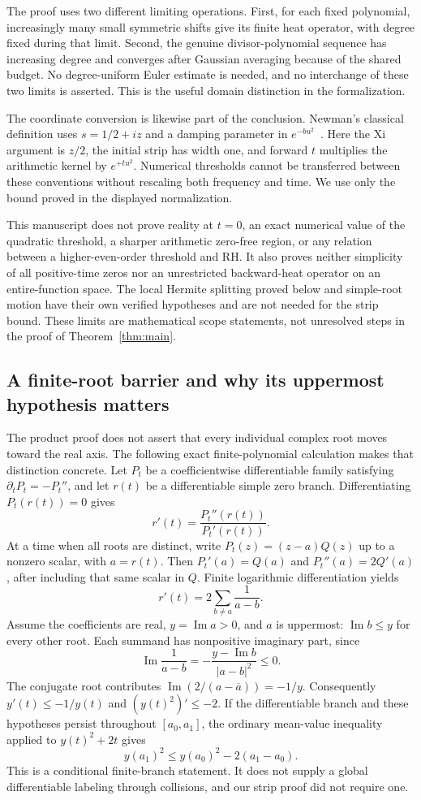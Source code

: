 \documentclass[11pt]{article}
\begin{document}
The proof uses two different limiting operations. First, for each fixed
polynomial, increasingly many small symmetric shifts give its finite
heat operator, with degree fixed during that limit. Second, the genuine
divisor-polynomial sequence has increasing degree and converges after
Gaussian averaging because of the shared budget. No degree-uniform
Euler estimate is needed, and no interchange of these two limits is
asserted. This is the useful domain distinction in the formalization.

The coordinate conversion is likewise part of the conclusion. Newman's
classical definition uses $s=1/2+iz$ and a damping parameter in
$e^{-bu^2}$~\cite{Newman}. Here the Xi argument is $z/2$, the initial
strip has width one, and forward $t$ multiplies the arithmetic kernel
by $e^{+tu^2}$. Numerical thresholds cannot be transferred between these
conventions without rescaling both frequency and time. We use only the
bound proved in the displayed normalization.

This manuscript does not prove reality at $t=0$, an exact numerical value of the quadratic
threshold, a sharper arithmetic zero-free region, or any relation between
a higher-even-order threshold and RH. It also proves neither simplicity
of all positive-time zeros nor an unrestricted backward-heat operator on
an entire-function space. The local Hermite splitting proved below and simple-root motion
have their own verified hypotheses and are not needed for the strip bound. These limits
are mathematical scope statements, not unresolved steps in the proof of
Theorem~\ref{thm:main}.



\subsection*{A finite-root barrier and why its uppermost hypothesis matters}
The product proof does not assert that every individual complex root
moves toward the real axis. The following exact finite-polynomial
calculation makes that distinction concrete.
Let $P_t$ be a coefficientwise differentiable family satisfying
$\partial_tP_t=-P_t''$, and let $r(t)$ be a differentiable simple
zero branch. Differentiating $P_t(r(t))=0$ gives
\[
 r'(t)=\frac{P_t''(r(t))}{P_t'(r(t))}.
\]
At a time when all roots are distinct, write $P_t(z)=(z-a)Q(z)$
up to a nonzero scalar, with $a=r(t)$. Then
$P_t'(a)=Q(a)$ and $P_t''(a)=2Q'(a)$, after including that same
scalar in $Q$. Finite logarithmic differentiation yields
\[
 r'(t)=2\sum_{b\ne a}\frac1{a-b}.
\]
Assume the coefficients are real, $y=\operatorname{Im}a>0$, and
$a$ is uppermost: $\operatorname{Im}b\leq y$ for every other root.
Each summand has nonpositive imaginary part, since
\[
 \operatorname{Im}\frac1{a-b}
 =-\frac{y-\operatorname{Im}b}{|a-b|^2}\leq0.
\]
The conjugate root contributes
$\operatorname{Im}(2/(a-\overline a))=-1/y$.
Consequently $y'(t)\leq-1/y(t)$ and
$(y(t)^2)'\leq-2$. If the differentiable branch and these hypotheses
persist throughout $[a_0,a_1]$, the ordinary mean-value inequality
applied to $y(t)^2+2t$ gives
\[
 y(a_1)^2\leq y(a_0)^2-2(a_1-a_0).
\]
This is a conditional finite-branch statement. It does not supply a
global differentiable labeling through collisions, and our strip proof
did not require one.
\end{document}
